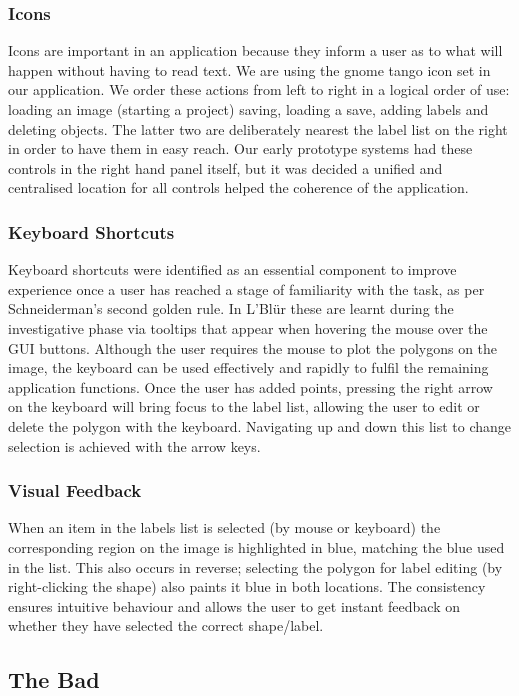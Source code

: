 \documentclass[a4paper,11pt,oneside]{article}
\begin{document}
\subsubsection{Icons}
Icons are important in an application because they inform a user as to what will
happen without having to read text.  We are using the gnome tango icon set in
our application.  We order these actions from left to right in a logical order
of use: loading an image (starting a project) saving, loading a save, adding
labels and deleting objects. The latter two are deliberately nearest the label
list on the right in order to have them in easy reach. Our early prototype
systems had these controls in the right hand panel itself, but it was decided a
unified and centralised location for all controls helped the coherence of the
application.

\subsubsection{Keyboard Shortcuts}
Keyboard shortcuts were identified as an essential component to improve
experience once a user has reached a stage of familiarity with the task, as per
Schneiderman's second golden rule.  In L'Bl\"{u}r these are learnt during the
investigative phase via tooltips that appear when hovering the mouse over the
GUI buttons. Although the user requires the mouse to plot the polygons on the
image, the keyboard can be used effectively and rapidly to fulfil the remaining
application functions. Once the user has added points, pressing the right arrow
on the keyboard will bring focus to the label list, allowing the user to edit or
delete the polygon with the keyboard. Navigating up and down this list to change
selection is achieved with the arrow keys.

\subsubsection{Visual Feedback}
When an item in the labels list is selected (by mouse or keyboard) the
corresponding region on the image is highlighted in blue, matching the blue
used in the list. This also occurs in reverse; selecting the polygon for label
editing (by right-clicking the shape) also paints it blue in both locations.
The consistency ensures intuitive behaviour and allows the user to get instant
feedback on whether they have selected the correct shape/label.

\subsection{The Bad}
\end{document}
